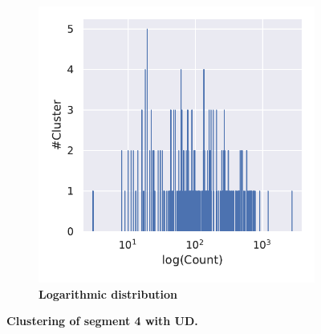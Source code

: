 \begin{figure}[!hbt]
\begin{subfigure}[b]{0.475\textwidth}
    \end{subfigure}
    \hfill
    \begin{subfigure}[b]{0.475\textwidth}
        \caption[Logarithmic distribution]{\textbf{Logarithmic distribution}}
        \label{subfig:UMAP_Cluster_DBCV_Distribution_log_4}            \includegraphics[width=\textwidth]{UMAP/Cluster_Distribution_Log_Segment_4_alternative.pdf}
    \end{subfigure}
    \caption[Clustering of segment 4 with UD]{\textbf{Clustering of segment 4 with UD.} }
    \label{fig:UMAP_Cluster_DBCV_4}
\end{figure}

\FloatBarrier

